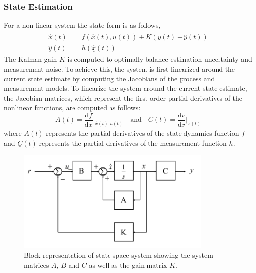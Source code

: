\subsubsection{State Estimation}
For a non-linear system the state form is as follows,
\begin{equation}
\begin{aligned}
	\dot{\hat{\underline{x}}}(t) &= f\left( \underline{\hat{x}}(t), \underline{u}(t) \right) + \underline{K}\left( y(t) - \hat{y}(t) \right) \\
	\hat{y}(t) &= h\left( \underline{\hat{x}}(t) \right)  \label{eq:eq}
\end{aligned}
\end{equation}
The Kalman gain $\underline{K}$ is computed to optimally balance estimation uncertainty and measurement noise. To achieve this, the system is first linearized around the current state estimate by computing the Jacobians of the process and measurement models. To linearize the system around the current state estimate, the Jacobian matrices, which represent the first-order partial derivatives of the nonlinear functions, are computed as follows:
\begin{equation}
\underline{A}(t) = \frac{\mathrm{d}f}{\mathrm{d}\underline{x}} \bigg|_{\underline{\hat{x}}(t), \underline{u}(t)} \quad \text{and} \quad
\underline{C}(t) = \frac{\mathrm{d}h}{\mathrm{d}\underline{x}} \bigg|_{\underline{\hat{x}}(t)}  \label{eq:eq}
\end{equation}
where $\underline{A}(t)$ represents the partial derivatives of the state dynamics function $f$ and $\underline{C}(t)$ represents the partial derivatives of the measurement function $h$.
\begin{figure}[h]
	\centering
	\includegraphics[height=5cm]{assets/block_representation_kalman_filter.png}
	\caption{Block representation of state space system showing the system matrices $A$, $B$ and $C$ as well as the gain matrix $K$.}
	\label{fig:block_representation_kalman_filter}
\end{figure}
